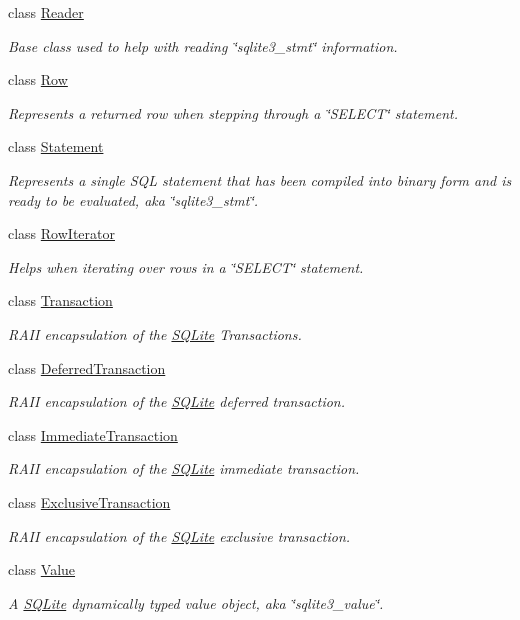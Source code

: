 \begin{DoxyCompactItemize}
class \hyperlink{a00010}{Reader}
\begin{DoxyCompactList}\small\item\em Base class used to help with reading \char`\"{}sqlite3\-\_\-stmt\char`\"{} information. \end{DoxyCompactList}\item 
class \hyperlink{a00011}{Row}
\begin{DoxyCompactList}\small\item\em Represents a returned row when stepping through a \char`\"{}\-S\-E\-L\-E\-C\-T\char`\"{} statement. \end{DoxyCompactList}\item 
class \hyperlink{a00013}{Statement}
\begin{DoxyCompactList}\small\item\em Represents a single S\-Q\-L statement that has been compiled into binary form and is ready to be evaluated, aka \char`\"{}sqlite3\-\_\-stmt\char`\"{}. \end{DoxyCompactList}\item 
class \hyperlink{a00012}{Row\-Iterator}
\begin{DoxyCompactList}\small\item\em Helps when iterating over rows in a \char`\"{}\-S\-E\-L\-E\-C\-T\char`\"{} statement. \end{DoxyCompactList}\item 
class \hyperlink{a00014}{Transaction}
\begin{DoxyCompactList}\small\item\em R\-A\-I\-I encapsulation of the \hyperlink{a00038}{S\-Q\-Lite} Transactions. \end{DoxyCompactList}\item 
class \hyperlink{a00005}{Deferred\-Transaction}
\begin{DoxyCompactList}\small\item\em R\-A\-I\-I encapsulation of the \hyperlink{a00038}{S\-Q\-Lite} deferred transaction. \end{DoxyCompactList}\item 
class \hyperlink{a00008}{Immediate\-Transaction}
\begin{DoxyCompactList}\small\item\em R\-A\-I\-I encapsulation of the \hyperlink{a00038}{S\-Q\-Lite} immediate transaction. \end{DoxyCompactList}\item 
class \hyperlink{a00007}{Exclusive\-Transaction}
\begin{DoxyCompactList}\small\item\em R\-A\-I\-I encapsulation of the \hyperlink{a00038}{S\-Q\-Lite} exclusive transaction. \end{DoxyCompactList}\item 
class \hyperlink{a00015}{Value}
\begin{DoxyCompactList}\small\item\em A \hyperlink{a00038}{S\-Q\-Lite} dynamically typed value object, aka \char`\"{}sqlite3\-\_\-value\char`\"{}. \end{DoxyCompactList}\end{DoxyCompactItemize}
